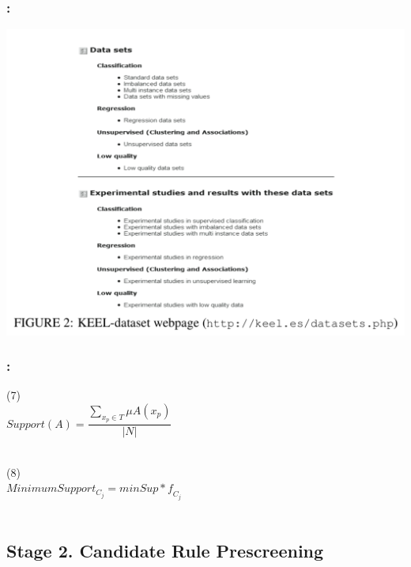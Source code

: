 \documentclass{beamer}
\begin{document}
\begin{CJK*}{UTF8}{bsmi}
\begin{frame}
	\frametitle{\insertsection : \insertsubsection}
\begin{center}
\includegraphics[width=1\linewidth]{./2.png}
\end{center}
\end{frame}


\begin{frame}
	\frametitle{\insertsection : \insertsubsection}
	
	\begin{block}{ (7)}
		~\\
		\centering\textbf{$Support(A)=\dfrac{\sum_{x_{p}\in T}^{ }{\mu A(x_{p})}}{|N|}$}\\
		~\\
	\end{block}
	\begin{block}{ (8)}
		~\\
		\centering\textbf{$MinimumSupport_{C_{j}}=minSup\ast \mathit{f}_{C_{j}}$}\\
		~\\
	\end{block}
	
\end{frame}


\subsection{Stage 2. Candidate Rule Prescreening}


\end{CJK*}
\end{document}
